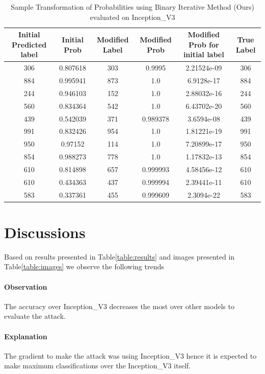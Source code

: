 \documentclass[letterpaper]{article}
\begin{document}
\begin{table}
\begin{center}


\begin{tabular}{|c|c|c|c|c|c|}
\hline
    Initial Predicted label & Initial Prob & Modified Label & Modified Prob & Modified Prob for initial label & True Label \\
\hline
    306 & 0.807618 & 303 & 0.9995 & 2.21524e-09 & 306 \\
\hline
    884 & 0.995941 & 873 & 1.0 & 6.9128e-17 & 884 \\
\hline
    244 & 0.946103 & 152 & 1.0 & 2.88032e-16 & 244 \\
\hline
    560 & 0.834364 & 542 & 1.0 & 6.43702e-20 & 560 \\
\hline
    439 & 0.542039 & 371 & 0.989378 & 3.6594e-08 & 439 \\
\hline
    991 & 0.832426 & 954 & 1.0 & 1.81221e-19 & 991 \\
\hline
    950 & 0.97152 & 114 & 1.0 & 7.20899e-17 & 950 \\
\hline
    854 & 0.988273 & 778 & 1.0 & 1.17832e-13 & 854 \\
\hline
    610 & 0.814898 & 657 & 0.999993 & 4.58456e-12 & 610 \\
\hline
    610 & 0.434363 & 437 & 0.999994 & 2.39441e-11 & 610 \\
\hline
    583 & 0.337361 & 455 & 0.999609 & 2.3094e-22 & 583 \\
\hline
\end{tabular}
\caption{Sample Transformation of Probabilities using Binary Iterative Method (Ours) evaluated on Inception\_V3}
\label{table:trans}
\end{center}
\end{table}

\section{Discussions}

Based on results presented in Table\ref{table:results} and images presented in Table\ref{table:images} we observe the following trends

\paragraph{Observation} The accuracy over Inception\_V3 decreases the most over other models to evaluate the attack.
\paragraph{Explanation} The gradient to make the attack was using Inception\_V3 hence it is expected to make maximum classifications over the Inception\_V3 itself.
\end{document}
